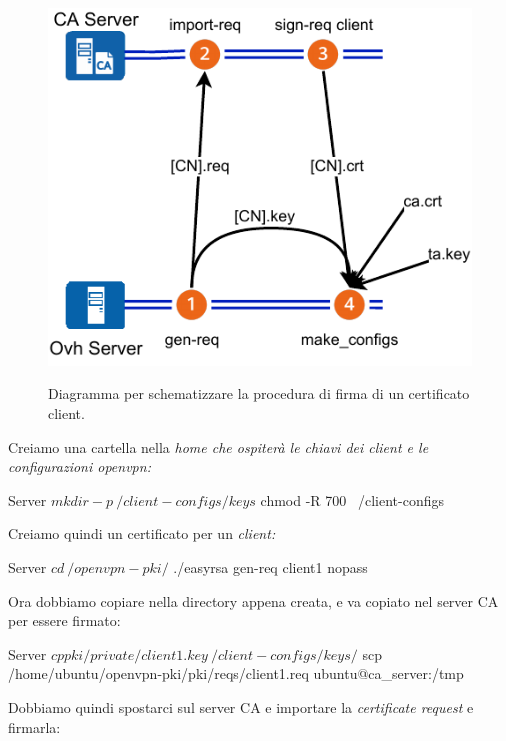 \begin{figure}[H]
    \centering
    \includegraphics[width=0.6\linewidth]{immagini/diag-firma_certificato_client}
    \label{fig:diag-firma_certificato_client}
    \caption{Diagramma per schematizzare la procedura di firma di un certificato client. \cite{icons}}
\end{figure}


Creiamo una cartella nella \it{home} che ospiterà le chiavi dei \it{client} e le configurazioni openvpn:

\begin{bashcode}{Server}{}
$ mkdir -p ~/client-configs/keys
$ chmod -R 700 ~/client-configs
\end{bashcode}

Creiamo quindi un certificato per un \it{client}:

\begin{bashcode}{Server}{}
$ cd ~/openvpn-pki/
$ ./easyrsa gen-req client1 nopass
\end{bashcode}

Ora dobbiamo copiare  nella directory appena creata, e  va copiato nel server CA per essere firmato:

\begin{bashcode}{Server}{}
$ cp pki/private/client1.key ~/client-configs/keys/
$ scp /home/ubuntu/openvpn-pki/pki/reqs/client1.req ubuntu@ca_server:/tmp
\end{bashcode}

Dobbiamo quindi spostarci sul server CA e importare la \textit{certificate request} e firmarla:


